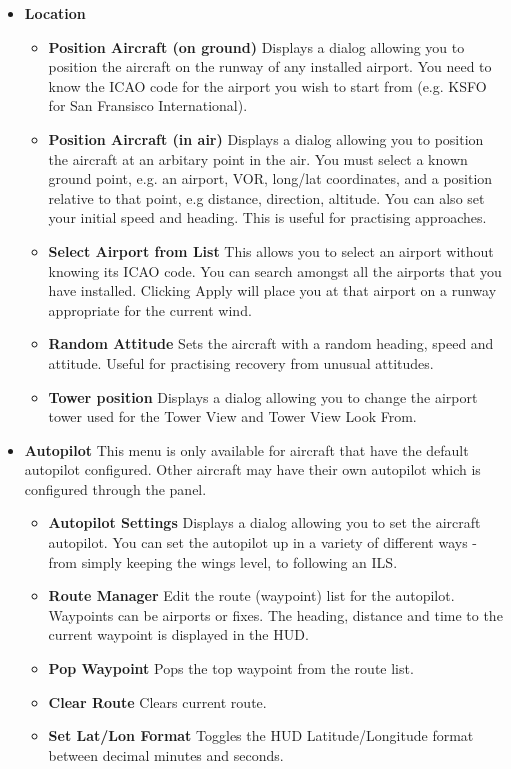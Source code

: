 \begin{itemize}
\item \textbf{Location}
 \begin{itemize}
   \item \textbf{Position Aircraft (on ground)}  Displays a dialog allowing you
to position the aircraft
   on the runway of any installed airport. You need to know the ICAO code for
the airport you wish to
   start from (e.g. KSFO for San Fransisco International).
   \item \textbf{Position Aircraft (in air)} Displays a dialog allowing you to
position the aircraft at
   an arbitary point in the air. You must select a known ground point, e.g. an
airport, VOR, long/lat
   coordinates, and a position relative to that point, e.g distance, direction,
altitude. You can also
   set your initial speed and heading. This is useful for practising approaches.
   \item \textbf{Select Airport from List} This allows you to select an airport
without knowing its ICAO
   code. You can search amongst all the airports that you have installed.
Clicking Apply will place you at that airport on a runway appropriate for the current wind.
   \item \textbf{Random Attitude} Sets the aircraft with a random heading, speed
and attitude. Useful for practising recovery from unusual attitudes.
   \item \textbf{Tower position} Displays a dialog allowing you to change the
airport tower used for the Tower View and Tower View Look From.
 \end{itemize}

\item \textbf{Autopilot} This menu is only available for
aircraft that have the default
autopilot configured. Other aircraft may have their own autopilot which is
configured through the panel.
 \begin{itemize}

   \item \textbf{Autopilot Settings} Displays a dialog allowing you to set the
aircraft autopilot.
   You can set the autopilot up in a variety of different ways - from simply
keeping the wings level, to following an ILS.
  \item \textbf{Route Manager} Edit the route (waypoint) list for the autopilot.
Waypoints can be airports or fixes. The heading, distance and time to the
current waypoint is displayed in the HUD.
  \item \textbf{Pop Waypoint} Pops the top waypoint from the route list.
 \item \textbf{Clear Route} Clears current route.
  \item \textbf{Set Lat/Lon Format} Toggles the HUD Latitude/Longitude format
between decimal minutes and seconds.
 \end{itemize}


\end{itemize}
